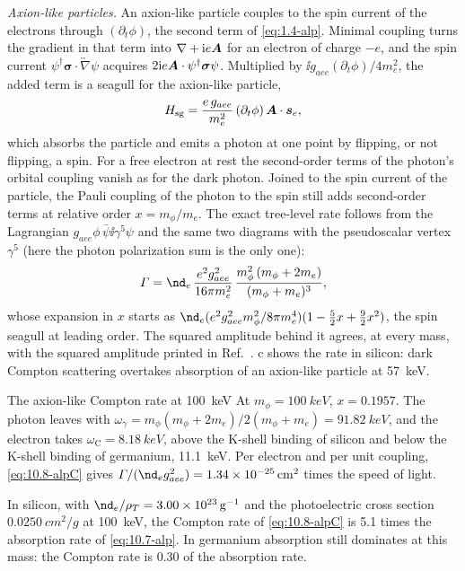 \emph{Axion-like particles.} An axion-like particle couples to the spin current of the electrons through $(\partial_t\phi)$, the second term of \cref{eq:1.4-alp}. Minimal coupling turns the gradient in that term into $\nabla + \mathrm{i} e\bm{A}$ for an electron of charge $-e$, and the spin current $\psi^\dagger\boldsymbol{\sigma}\cdot\overleftrightarrow{\nabla}\psi$ acquires $2\mathrm{i} e\bm{A}\cdot\psi^\dagger\boldsymbol{\sigma}\psi$. Multiplied by $\ii g_{aee}(\partial_t\phi)/4m_e^2$, the added term is a seagull for the axion-like particle,
\begin{equation*}
  H_{\mathrm{sg}} = \frac{e\,g_{aee}}{m_e^2}\,(\partial_t\phi)\,\bm{A}\cdot\bm{s}_e ,
\end{equation*}
which absorbs the particle and emits a photon at one point by flipping, or not flipping, a spin. For a free electron at rest the second-order terms of the photon's orbital coupling vanish as for the dark photon. Joined to the spin current of the particle, the Pauli coupling of the photon to the spin still adds second-order terms at relative order $x = m_\phi/m_e$. The exact tree-level rate follows from the Lagrangian $g_{aee}\phi\,\bar\psi\ii\gamma^5\psi$ and the same two diagrams with the pseudoscalar vertex $\gamma^5$ (here the photon polarization sum is the only one):
\begin{equation}
  \varGamma = \nd_e\,\frac{e^2g_{aee}^2}{16\pi m_e^2}\,\frac{m_\phi^2\,(m_\phi + 2m_e)}{(m_\phi + m_e)^3} ,
  \label{eq:10.8-alpC}
\end{equation}
whose expansion in $x$ starts as $\nd_e(e^2g_{aee}^2m_\phi^2/8\pi m_e^4)(1 - \frac52x + \frac92x^2)$, the spin seagull at leading order. The squared amplitude behind it agrees, at every mass, with the squared amplitude printed in Ref.~\cite[Eq.~(15)]{hochberg2022impact}. c shows the rate in silicon: dark Compton scattering overtakes absorption of an axion-like particle at \SI{57}{keV}.

\begin{workedexample}{The axion-like Compton rate at \SI{100}{keV}}\label{we:10-alpcompton}
At $m_\phi = \SI{100}{keV}$, $x = 0.1957$. The photon leaves with $\omega_\gamma = m_\phi(m_\phi + 2m_e)/2(m_\phi + m_e) = \SI{91.82}{keV}$, and the electron takes $\omega_{\mathrm{C}} = \SI{8.18}{keV}$, above the K-shell binding of silicon and below the K-shell binding of germanium, \SI{11.1}{keV}. Per electron and per unit coupling, \cref{eq:10.8-alpC} gives $\varGamma/(\nd_eg_{aee}^2) = \SI{1.34e-25}{cm^2}$ times the speed of light.

In silicon, with $\nd_e/\rho_T = 3.00\times10^{23}\,\mathrm{g}^{-1}$ and the photoelectric cross section $\SI{0.0250}{cm^2/g}$ at \SI{100}{keV}, the Compton rate of \cref{eq:10.8-alpC} is 5.1 times the absorption rate of \cref{eq:10.7-alp}. In germanium absorption still dominates at this mass: the Compton rate is 0.30 of the absorption rate.
\end{workedexample}

